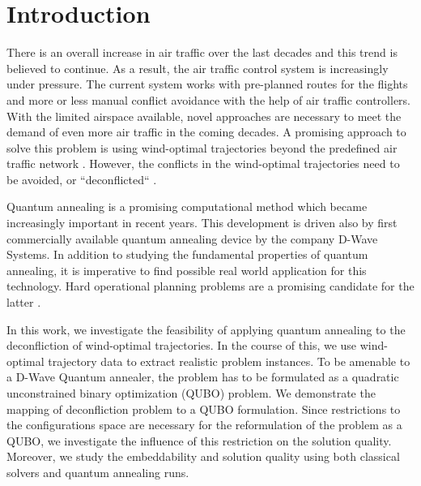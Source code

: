 \section{Introduction}
There is an overall increase in air traffic over the last decades and this trend is believed to continue.
As a result, the air traffic control system is increasingly under pressure.
The current system works with pre-planned routes for the flights and more or less manual conflict avoidance with the help of air traffic controllers.
With the limited airspace available, novel approaches are necessary to meet the demand of even more air traffic in the coming decades.
A promising approach to solve this problem is using wind-optimal trajectories beyond the predefined air traffic network \cite{ng_optimizing_2014}.
However, the conflicts in the wind-optimal trajectories need to be avoided, or ``deconflicted``  \cite{rodionova16}.

Quantum annealing is a promising computational method which became increasingly important in recent years.
This development is driven also by first commercially available quantum annealing device by the company D-Wave Systems.
In addition to studying the fundamental properties of quantum annealing, it is imperative to find possible real world application for this technology.
Hard operational planning problems are a promising candidate for the latter \cite{Rieffel2015, AAAI148614, Venturelli2015}.

In this work, we investigate the feasibility of applying quantum annealing to the deconfliction of wind-optimal trajectories. 
In the course of this, we use wind-optimal trajectory data to extract realistic problem instances.
To be amenable to a D-Wave Quantum annealer, the problem has to be formulated as a quadratic unconstrained binary optimization (QUBO) problem.
We demonstrate the mapping of deconfliction problem to a QUBO formulation.
Since restrictions to the configurations space are necessary for the reformulation of the problem as a QUBO, we investigate the influence of this restriction on the solution quality.
Moreover, we study the embeddability and solution quality using both classical solvers and quantum annealing runs.

